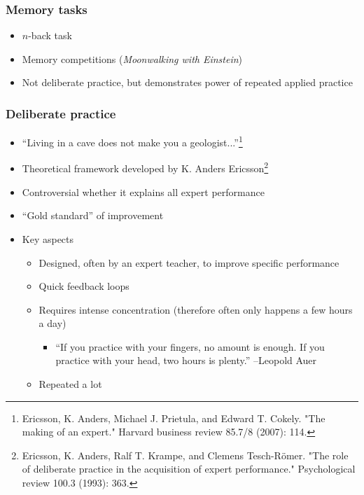 \documentclass{beamer}
\begin{document}
\begin{frame}
  \frametitle{Memory tasks}
  \begin{itemize}
    \item $n$-back task
    \item Memory competitions (\textit{Moonwalking with Einstein})
    \item Not deliberate practice, but demonstrates power of repeated applied practice
  \end{itemize}
\end{frame}

\begin{frame}
  \frametitle{Deliberate practice}
  \begin{itemize}
    \item ``Living in a cave does not make you a geologist...''\footnote{Ericsson, K. Anders, Michael J. Prietula, and Edward T. Cokely. "The making of an expert." Harvard business review 85.7/8 (2007): 114.}
    \item Theoretical framework developed by K. Anders Ericsson\footnote{Ericsson, K. Anders, Ralf T. Krampe, and Clemens Tesch-Römer. "The role of deliberate practice in the acquisition of expert performance." Psychological review 100.3 (1993): 363.}
    \item Controversial whether it explains all expert performance
    \item ``Gold standard'' of improvement
    \item Key aspects
      \begin{itemize}
        \item Designed, often by an expert teacher, to improve specific performance
	\item Quick feedback loops
	\item Requires intense concentration (therefore often only happens a few hours a day)
	\begin{itemize}
	  \item ``If you practice with your fingers, no amount is enough. If you practice with your head, two hours is plenty.'' --Leopold Auer
	\end{itemize}
	\item Repeated a lot
      \end{itemize}
  \end{itemize}
\end{frame}
\end{document}
